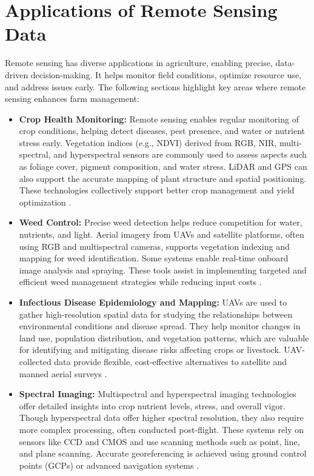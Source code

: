\section{Applications of Remote Sensing Data}
Remote sensing has diverse applications in agriculture, enabling precise, data-driven decision-making. It helps monitor field conditions, optimize resource use, and address issues early. The following sections highlight key areas where remote sensing enhances farm management:

\begin{itemize}[leftmargin=1.5em]

    \item \textbf{Crop Health Monitoring:} Remote sensing enables regular monitoring of crop conditions, helping detect diseases, pest presence, and water or nutrient stress early. Vegetation indices (e.g., NDVI) derived from RGB, NIR, multi-spectral, and hyperspectral sensors are commonly used to assess aspects such as foliage cover, pigment composition, and water stress. LiDAR and GPS can also support the accurate mapping of plant structure and spatial positioning. These technologies collectively support better crop management and yield optimization \parencite{phang2023satellite}.
    
    \item \textbf{Weed Control:} Precise weed detection helps reduce competition for water, nutrients, and light. Aerial imagery from UAVs and satellite platforms, often using RGB and multispectral cameras, supports vegetation indexing and mapping for weed identification. Some systems enable real-time onboard image analysis and spraying. These tools assist in implementing targeted and efficient weed management strategies while reducing input costs \parencite{phang2023satellite}.
    
    \item \textbf{Infectious Disease Epidemiology and Mapping:} UAVs are used to gather high-resolution spatial data for studying the relationships between environmental conditions and disease spread. They help monitor changes in land use, population distribution, and vegetation patterns, which are valuable for identifying and mitigating disease risks affecting crops or livestock. UAV-collected data provide flexible, cost-effective alternatives to satellite and manned aerial surveys \parencite{phang2023satellite}.
    
    \item \textbf{Spectral Imaging:} Multispectral and hyperspectral imaging technologies offer detailed insights into crop nutrient levels, stress, and overall vigor. Though hyperspectral data offer higher spectral resolution, they also require more complex processing, often conducted post-flight. These systems rely on sensors like CCD and CMOS and use scanning methods such as point, line, and plane scanning. Accurate georeferencing is achieved using ground control points (GCPs) or advanced navigation systems \parencite{phang2023satellite}.
    
\end{itemize}

